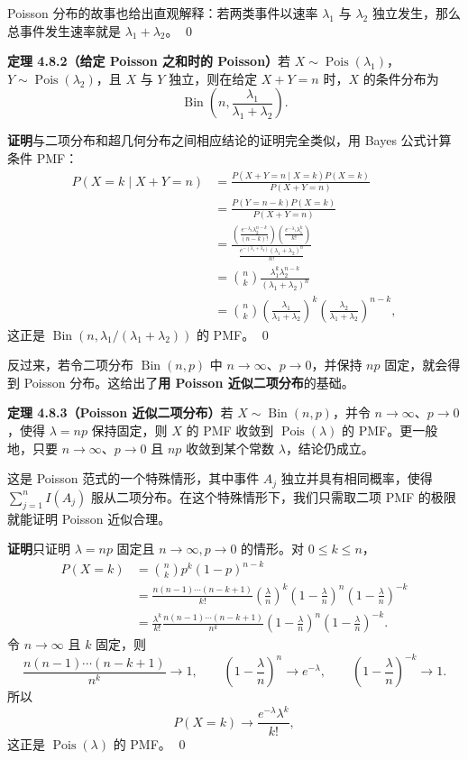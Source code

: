 \documentclass[UTF8, 12pt, fontset=fandol, oneside]{ctexart}
\begin{document}
Poisson 分布的故事也给出直观解释：若两类事件以速率 $\lambda_1$ 与 $\lambda_2$ 独立发生，那么总事件发生速率就是 $\lambda_1+\lambda_2$。 \qed

\noindent\textbf{定理 4.8.2（给定 Poisson 之和时的 Poisson）}\quad 若 $X\sim\operatorname{Pois}(\lambda_1)$，$Y\sim\operatorname{Pois}(\lambda_2)$，且 $X$ 与 $Y$ 独立，则在给定 $X+Y=n$ 时，$X$ 的条件分布为
\[
  \operatorname{Bin}\left(n,\frac{\lambda_1}{\lambda_1+\lambda_2}\right).
\]

\noindent\textbf{证明}\quad 与二项分布和超几何分布之间相应结论的证明完全类似，用 Bayes 公式计算条件 PMF：
\[
\begin{aligned}
  P(X=k\mid X+Y=n)
  &=\frac{P(X+Y=n\mid X=k)P(X=k)}{P(X+Y=n)}\\
  &=\frac{P(Y=n-k)P(X=k)}{P(X+Y=n)}\\
  &=\frac{\left(\frac{e^{-\lambda_2}\lambda_2^{n-k}}{(n-k)!}\right)
    \left(\frac{e^{-\lambda_1}\lambda_1^k}{k!}\right)}
    {\frac{e^{-(\lambda_1+\lambda_2)}(\lambda_1+\lambda_2)^n}{n!}}\\
  &=\binom{n}{k}\frac{\lambda_1^k\lambda_2^{n-k}}{(\lambda_1+\lambda_2)^n}\\
  &=\binom{n}{k}
    \left(\frac{\lambda_1}{\lambda_1+\lambda_2}\right)^k
    \left(\frac{\lambda_2}{\lambda_1+\lambda_2}\right)^{n-k},
\end{aligned}
\]
这正是 $\operatorname{Bin}(n,\lambda_1/(\lambda_1+\lambda_2))$ 的 PMF。 \qed

反过来，若令二项分布 $\operatorname{Bin}(n,p)$ 中 $n\to\infty$、$p\to 0$，并保持 $np$ 固定，就会得到 Poisson 分布。这给出了\textbf{用 Poisson 近似二项分布}的基础。

\noindent\textbf{定理 4.8.3（Poisson 近似二项分布）}\quad 若 $X\sim\operatorname{Bin}(n,p)$，并令 $n\to\infty$、$p\to 0$，使得 $\lambda=np$ 保持固定，则 $X$ 的 PMF 收敛到 $\operatorname{Pois}(\lambda)$ 的 PMF。更一般地，只要 $n\to\infty$、$p\to 0$ 且 $np$ 收敛到某个常数 $\lambda$，结论仍成立。

这是 Poisson 范式的一个特殊情形，其中事件 $A_j$ 独立并具有相同概率，使得 $\sum_{j=1}^n I(A_j)$ 服从二项分布。在这个特殊情形下，我们只需取二项 PMF 的极限就能证明 Poisson 近似合理。

\noindent\textbf{证明}\quad 只证明 $\lambda=np$ 固定且 $n\to\infty,p\to 0$ 的情形。对 $0\le k\le n$，
\[
\begin{aligned}
  P(X=k)
  &=\binom{n}{k}p^k(1-p)^{n-k}\\
  &=\frac{n(n-1)\cdots(n-k+1)}{k!}
    \left(\frac{\lambda}{n}\right)^k
    \left(1-\frac{\lambda}{n}\right)^n
    \left(1-\frac{\lambda}{n}\right)^{-k}\\
  &=\frac{\lambda^k}{k!}
    \frac{n(n-1)\cdots(n-k+1)}{n^k}
    \left(1-\frac{\lambda}{n}\right)^n
    \left(1-\frac{\lambda}{n}\right)^{-k}.
\end{aligned}
\]
令 $n\to\infty$ 且 $k$ 固定，则
\[
  \frac{n(n-1)\cdots(n-k+1)}{n^k}\to 1,\qquad
  \left(1-\frac{\lambda}{n}\right)^n\to e^{-\lambda},\qquad
  \left(1-\frac{\lambda}{n}\right)^{-k}\to 1.
\]
所以
\[
  P(X=k)\to \frac{e^{-\lambda}\lambda^k}{k!},
\]
这正是 $\operatorname{Pois}(\lambda)$ 的 PMF。 \qed
\end{document}
